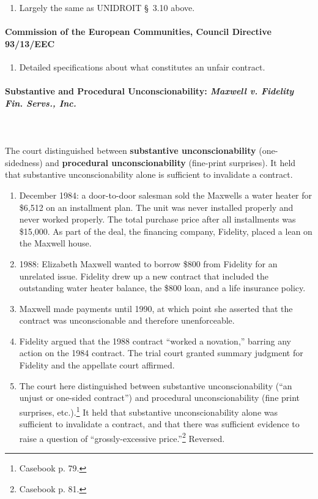 \begin{enumerate}
    \item Largely the same as UNIDROIT \S\ 3.10 above.
\end{enumerate}

\paragraph{Commission of the European Communities, Council Directive 
93/13/EEC}

\begin{enumerate}
    \item Detailed specifications about what constitutes an unfair contract.
\end{enumerate}

\paragraph{Substantive and Procedural Unconscionability: \emph{Maxwell v. 
Fidelity Fin. Servs., Inc.}}
~\\\\
The court distinguished between \textbf{substantive unconscionability} 
(one-sidedness) and \textbf{procedural unconscionability} (fine-print 
surprises). It held that substantive unconscionability alone is sufficient to 
invalidate a contract.

\begin{enumerate}
    \item December 1984: a door-to-door salesman sold the Maxwells a water 
    heater for \$6,512 on an installment plan. The unit was never installed 
    properly and never worked properly. The total purchase price after all 
    installments was \$15,000. As part of the deal, the financing company, 
    Fidelity, placed a lean on the Maxwell house.
    \item 1988: Elizabeth Maxwell wanted to borrow \$800 from Fidelity for an 
    unrelated issue. Fidelity drew up a new contract that included the 
    outstanding water heater balance, the \$800 loan, and a life insurance 
    policy.
    \item Maxwell made payments until 1990, at which point she asserted that 
    the contract was unconscionable and therefore unenforceable.
    \item Fidelity argued that the 1988 contract ``worked a novation,'' 
    barring any action on the 1984 contract. The trial court granted summary 
    judgment for Fidelity and the appellate court affirmed.
    \item The court here distinguished between substantive unconscionability 
    (``an unjust or one-sided contract'') and procedural unconscionability 
    (fine print surprises, etc.).\footnote{Casebook p. 79.} It held that 
    substantive unconscionability alone was sufficient to invalidate a 
    contract, and that there was sufficient evidence to raise a question of 
    ``grossly-excessive price.''\footnote{Casebook p. 81.} Reversed.
\end{enumerate}

